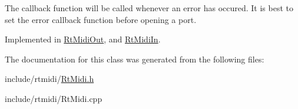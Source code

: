 The callback function will be called whenever an error has occured. It is best to set the error callback function before opening a port. 

Implemented in \hyperlink{class_rt_midi_out_a91a4571214f7b033312cc6cb661d3253}{Rt\+Midi\+Out}, and \hyperlink{class_rt_midi_in_ad70189a24427b3169d81fcc69f6441e0}{Rt\+Midi\+In}.



The documentation for this class was generated from the following files\+:\begin{DoxyCompactItemize}
\item 
include/rtmidi/\hyperlink{_rt_midi_8h}{Rt\+Midi.\+h}\item 
include/rtmidi/Rt\+Midi.\+cpp\end{DoxyCompactItemize}
